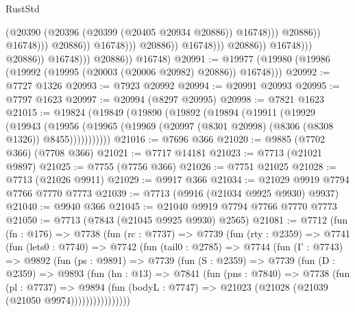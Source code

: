 \begin{lexlean}{RustStd}
\begin{coremodule}
                                                              (@20390
                                                                (@20396
                                                                  (@20399 (@20405 @20934 @20886))
                                                                  @16748)))
                                                            @20886))
                                                        @16748)))
                                                  @20886))
                                              @16748)))
                                        @20886))
                                    @16748)))
                              @20886))
                          @16748)))
                    @20886))
                @16748)))
          @20886))
      @16748)
@20991 := @19977 (@19980 (@19986 (@19992 (@19995 (@20003 (@20006 @20982) @20886)) @16748)))
@20992 := @7727 @1326
@20993 := @7923 @20992
@20994 := @20991 @20993
@20995 := @7797 @1623
@20997 := @20994 (@8297 @20995)
@20998 := @7821 @1623
@21015 := @19824
    (@19849
      (@19890
        (@19892
          (@19894
            (@19911
              (@19929
                (@19943
                  (@19956
                    (@19965 (@19969 (@20997 (@8301 @20998) (@8306 (@8308 @1326)) @8455)))))))))))
@21016 := @7696 @366
@21020 := @9885 (@7702 @366) (@7708 @366)
@21021 := @7717 @14181
@21023 := @7713 (@21021 @9897)
@21025 := @7755 (@7756 @366)
@21026 := @7751 @21025
@21028 := @7713 (@21026 @9911)
@21029 := @9917 @366
@21034 := @21029 @9919 @7794 @7766 @7770 @7773
@21039 := @7713 (@9916 (@21034 @9925 @9930) @9937)
@21040 := @9940 @366
@21045 := @21040 @9919 @7794 @7766 @7770 @7773
@21050 := @7713 (@7843 (@21045 @9925 @9930) @2565)
@21081 := @7712
    (fun (fn : @176) =>
    @7738
      (fun (rc : @7737) =>
      @7739
        (fun (rty : @2359) =>
        @7741
          (fun (lets0 : @7740) =>
          @7742
            (fun (tail0 : @2785) =>
            @7744
              (fun (Γ : @7743) =>
              @9892
                (fun (ps : @9891) =>
                @7739
                  (fun (S : @2359) =>
                  @7739
                    (fun (D : @2359) =>
                    @9893
                      (fun (hn : @13) =>
                      @7841
                        (fun (pns : @7840) =>
                        @7738
                          (fun (pl : @7737) =>
                          @9894
                            (fun (bodyL : @7747) =>
                            @21023 (@21028 (@21039 (@21050 @9974))))))))))))))))

\end{coremodule}
\end{lexlean}
